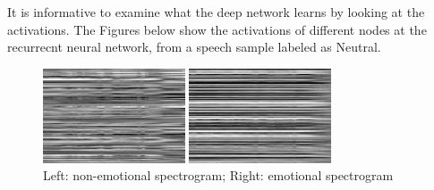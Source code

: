 \documentclass[a4paper]{article}
\begin{document}
It is informative to examine what the deep network learns by looking at the activations. The Figures below show the activations of different nodes at the recurrecnt neural network, from a speech sample labeled as Neutral.

\begin{figure}[htb]
    \begin{minipage}[b]{.45\linewidth}
      \centering
      \centerline{\includegraphics[width=4.2cm]{rnn_out_const_neu_comp}}
    \end{minipage}
    \hfill
    \begin{minipage}[b]{0.45\linewidth}
      \centering
      \centerline{\includegraphics[width=4.2cm]{rnn_out_var_neu_comp}}
    \end{minipage}
    \caption{Left: non-emotional spectrogram; Right: emotional spectrogram}
    \label{fig:rnn_com}
\end{figure}
\end{document}
